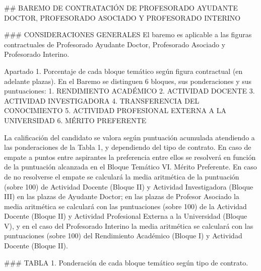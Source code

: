 \documentclass{article}
\begin{document}
\begin{itemize}
\begin{itemize}
\begin{scriptsize}
                  \#\# BAREMO DE CONTRATACIÓN DE PROFESORADO AYUDANTE DOCTOR, PROFESORADO ASOCIADO Y PROFESORADO INTERINO

                  \#\#\# CONSIDERACIONES GENERALES
                  El baremo es aplicable a las figuras contractuales de Profesorado Ayudante Doctor, Profesorado Asociado y Profesorado Interino.

                  Apartado 1. Porcentaje de cada bloque temático según figura contractual (en adelante plazas).
                  En el Baremo se distinguen 6 bloques, sus ponderaciones y sus puntuaciones:
                  1. RENDIMIENTO ACADÉMICO
                  2. ACTIVIDAD DOCENTE
                  3. ACTIVIDAD INVESTIGADORA
                  4. TRANSFERENCIA DEL CONOCIMIENTO
                  5. ACTIVIDAD PROFESIONAL EXTERNA A LA UNIVERSIDAD
                  6. MÉRITO PREFERENTE

                  La calificación del candidato se valora según puntuación acumulada atendiendo a las ponderaciones de la Tabla 1, y dependiendo del tipo de contrato. En caso de empate a puntos entre aspirantes la preferencia entre ellos se resolverá en función de la puntuación alcanzada en el Bloque Temático VI. Mérito Preferente. En caso de no resolverse el empate se calculará la media aritmética de la puntuación (sobre 100) de Actividad Docente (Bloque II) y Actividad Investigadora (Bloque III) en las plazas de Ayudante Doctor; en las plazas de Profesor Asociado la media aritmética se calculará con las puntuaciones (sobre 100) de la Actividad Docente (Bloque II) y Actividad Profesional Externa a la Universidad (Bloque V), y en el caso del Profesorado Interino la media aritmética se calculará con las puntuaciones (sobre 100) del Rendimiento Académico (Bloque I) y Actividad Docente (Bloque II).

                  \#\#\# TABLA 1. Ponderación de cada bloque temático según tipo de contrato.


\end{scriptsize}
\end{itemize}
\end{itemize}
\end{document}
